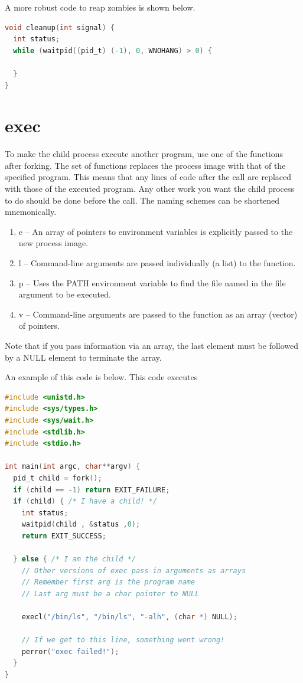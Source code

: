 A more robust code to reap zombies is shown below.

\begin{lstlisting}[language=C]
void cleanup(int signal) {
  int status;
  while (waitpid((pid_t) (-1), 0, WNOHANG) > 0) {

  }
}
\end{lstlisting}

\section{exec}

To make the child process execute another program, use one of the \href{http://man7.org/linux/man-pages/man3/exec.3.html}{} functions after forking.
The  set of functions replaces the process image with that of the specified program.
This means that any lines of code after the  call are replaced with those of the executed program.
Any other work you want the child process to do should be done before the  call.
The naming schemes can be shortened mnemonically.

\begin{enumerate}
    \item e -- An array of pointers to environment variables is explicitly passed to the new process image.
    \item l -- Command-line arguments are passed individually (a list) to the function.
    \item p -- Uses the PATH environment variable to find the file named in the file argument to be executed.
    \item v -- Command-line arguments are passed to the function as an array (vector) of pointers.
\end{enumerate}

Note that if you pass information via an array, the last element must be followed by a NULL element to terminate the array.

An example of this code is below. This code executes 

\begin{lstlisting}[language=C]
#include <unistd.h>
#include <sys/types.h>
#include <sys/wait.h>
#include <stdlib.h>
#include <stdio.h>

int main(int argc, char**argv) {
  pid_t child = fork();
  if (child == -1) return EXIT_FAILURE;
  if (child) { /* I have a child! */
    int status;
    waitpid(child , &status ,0);
    return EXIT_SUCCESS;

  } else { /* I am the child */
    // Other versions of exec pass in arguments as arrays
    // Remember first arg is the program name
    // Last arg must be a char pointer to NULL

    execl("/bin/ls", "/bin/ls", "-alh", (char *) NULL);

    // If we get to this line, something went wrong!
    perror("exec failed!");
  }
}
\end{lstlisting}


